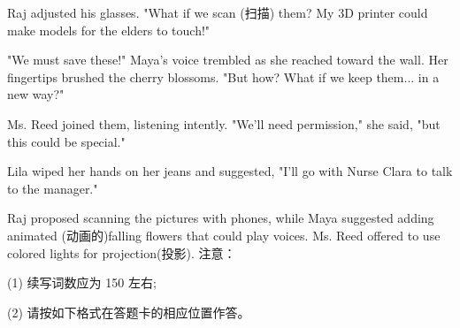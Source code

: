 \documentclass{英语试卷}
\begin{document}
\par Raj adjusted his glasses. "What if we scan (扫描) them? My 3D printer could make models for the elders to touch!"\par
\par "We must save these!" Maya's voice trembled as she reached toward the wall. Her fingertips brushed the cherry blossoms. "But how? What if we keep them... in a new way?"\par
\par Ms. Reed joined them, listening intently. "We'll need permission," she said, "but this could be special."\par
\par Lila wiped her hands on her jeans and suggested, "I'll go with Nurse Clara to talk to the manager."\par
\par Raj proposed scanning the pictures with phones, while Maya suggested adding animated (动画的)falling flowers that could play voices. Ms. Reed offered to use colored lights for projection(投影). 注意：\par
\par (1) 续写词数应为 150 左右;\par
\par (2) 请按如下格式在答题卡的相应位置作答。\par
{}
\end{document}
